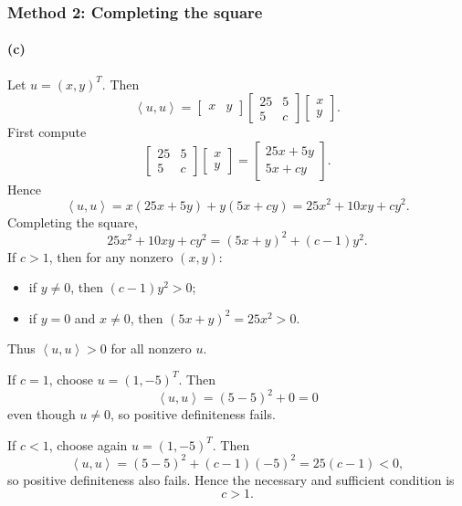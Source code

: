 \documentclass[12pt]{article}
\newcommand{\ip}[2]{\left\langle #1,#2\right\rangle}
\begin{document}
\subsubsection{Method 2: Completing the square}

\paragraph{(c)}
Let $u=(x,y)^T$. Then
\[
\ip{u}{u}
=\begin{bmatrix}x&y\end{bmatrix}
\begin{bmatrix}25&5\\5&c\end{bmatrix}
\begin{bmatrix}x\\y\end{bmatrix}.
\]
First compute
\[
\begin{bmatrix}25&5\\5&c\end{bmatrix}
\begin{bmatrix}x\\y\end{bmatrix}
=
\begin{bmatrix}25x+5y\\5x+cy\end{bmatrix}.
\]
Hence
\[
\ip{u}{u}=x(25x+5y)+y(5x+cy)
=25x^2+10xy+cy^2.
\]
Completing the square,
\[
25x^2+10xy+cy^2
=(5x+y)^2+(c-1)y^2.
\]
If $c>1$, then for any nonzero $(x,y)$:
\begin{itemize}[leftmargin=1.6em]
  \item if $y\neq0$, then $(c-1)y^2>0$;
  \item if $y=0$ and $x\neq0$, then $(5x+y)^2=25x^2>0$.
\end{itemize}
Thus $\ip{u}{u}>0$ for all nonzero $u$.

If $c=1$, choose $u=(1,-5)^T$. Then
\[
\ip{u}{u}=(5-5)^2+0=0
\]
even though $u\neq0$, so positive definiteness fails.

If $c<1$, choose again $u=(1,-5)^T$. Then
\[
\ip{u}{u}=(5-5)^2+(c-1)(-5)^2=25(c-1)<0,
\]
so positive definiteness also fails. Hence the necessary and sufficient condition is
\[
\boxed{c>1.}
\]
\end{document}
